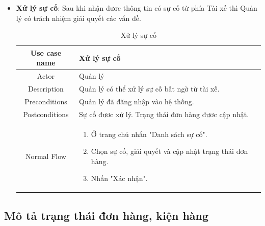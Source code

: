 \begin{itemize}
\begin{itemize}
			\item \textbf{Xử lý sự cố}: Sau khi nhận đươc thông tin có sự cố từ phía Tài xế thì Quản lý có trách nhiệm giải quyết các vấn đề. 
			
			\begin{table}[H]
				\centering\begin{tabular}{|c|m{25em}|}
					\hline 
					Use case name & Xử lý sự cố\\ 
					\hline 
					Actor & Quản lý \\ 
					\hline
					Description & Quản lý có thể xử lý sự cố bất ngờ từ tài xế. \\
					\hline 
					Preconditions & Quản lý đã đăng nhập vào hệ thống. \\
					\hline
					Postconditions & Sự cố đươc xử lý. Trạng thái đơn hàng đươc cập nhật. \\
					\hline
					Normal Flow & \begin{enumerate}
						\item Ở trang chủ nhấn "Danh sách sự cố".
						\item Chọn sự cố, giải quyết và cập nhật trạng thái đơn hàng.
						\item Nhấn "Xác nhận".
					\end{enumerate}
					\\
					\hline
				\end{tabular}
				\caption{Xử lý sự cố}
			\end{table}
			
			
		\end{itemize}
	\end{itemize}

\newpage
    
    \subsection{Mô tả trạng thái đơn hàng, kiện hàng}
    
